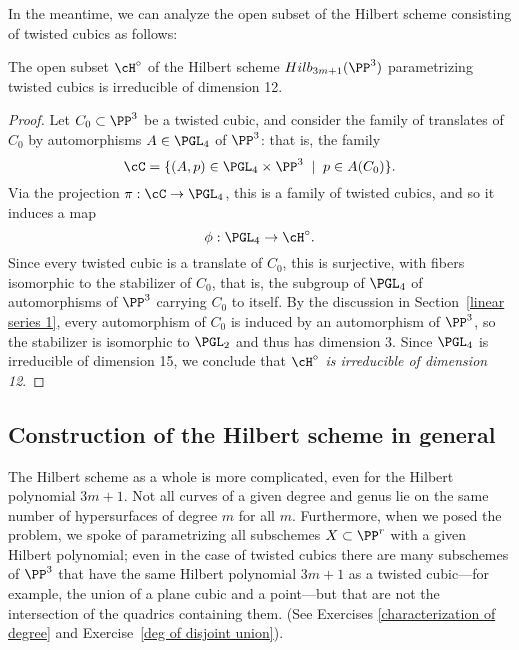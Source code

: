 In the meantime, we can analyze the open subset of the Hilbert scheme consisting of twisted cubics as follows:

\begin{proposition}\label{hilb of twisted cubics}
The open subset $\cH^\circ$ of the Hilbert scheme $Hilb_{3m+1}(\PP^3)$ parametrizing twisted cubics is irreducible of dimension 12.
\end{proposition}

\begin{proof}  Let $C_0 \subset \PP^3$ be a twisted cubic, and consider the family of translates of $C_0$ by automorphisms $A \in \PGL_4$ of $\PP^3$: that is, the family
$$
\cC = \{ (A, p) \in \PGL_4 \times \PP^3 \; \mid \; p \in A(C_0) \}.
$$
Via the projection $\pi : \cC \to \PGL_4$, this is a family of twisted cubics, and so it induces a map
$$
\phi : \PGL_4 \to \cH^\circ.
$$
Since every twisted cubic is a translate of $C_0$, this is surjective, with fibers isomorphic to the stabilizer of $C_0$, that is, the subgroup of $\PGL_4$ of automorphisms of $\PP^3$ carrying $C_0$ to itself. By the discussion in Section~\ref{linear series 1}, every automorphism of $C_{0}$ is induced by an automorphism of $\PP^{3}$, so the stabilizer is isomorphic to $\PGL_2$ and  thus has dimension 3. Since $\PGL_4$ is irreducible of dimension 15, we conclude that \emph{$\cH^\circ$ is irreducible of dimension 12}.
\end{proof}


\subsection{Construction of the Hilbert scheme in general}

The Hilbert scheme as a whole is more complicated, even for the Hilbert polynomial $3m+1$. Not all curves of a given degree and genus lie on the same number of hypersurfaces of degree $m$ for all $m$. Furthermore, when we posed the problem, we spoke of parametrizing all subschemes $X \subset \PP^r$ with a given Hilbert polynomial; even in the case of twisted cubics there are many subschemes of $\PP^3$ that have the same Hilbert polynomial $3m+1$ as a twisted cubic---for example, the union of a plane cubic and a point---but that are not the intersection of the quadrics containing them. (See Exercises \ref{characterization of degree} and Exercise~\ref{deg of disjoint union}). 

